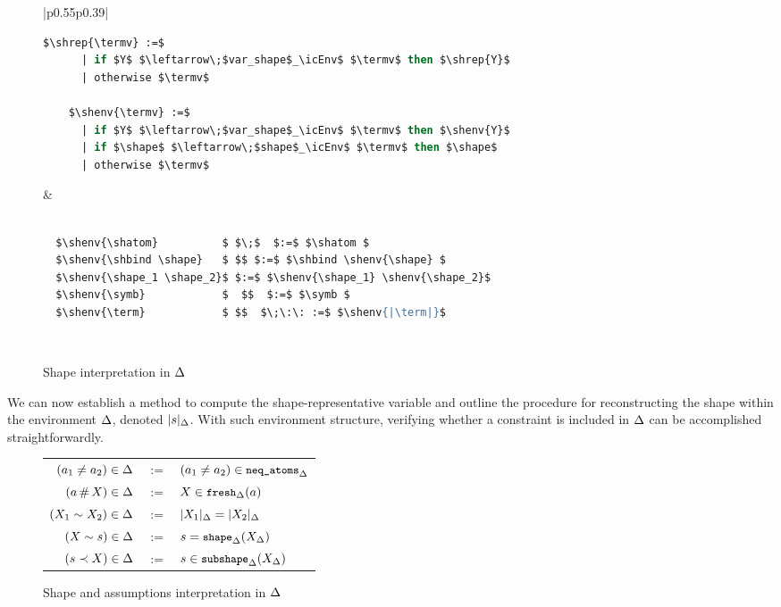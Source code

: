 \documentclass[english, mgr]{iithesis}
\renewcommand{\tt}[1]{\texttt{\small{#1}}}
\newcommand{\NeqAtoms}{\tt{neq\_atoms}}
\newcommand{\Fresh}{\tt{fresh}}
\newcommand{\Shape}{\tt{shape}}
\newcommand{\Subshape}{\tt{subshape}}
\newcommand{\shrep}[2][\icEnv]{\ensuremath{ #2_{#1}}}
\newcommand{\shenv}[2][\icEnv]{\ensuremath{ |#2|_{#1}}}
\begin{document}
\begin{figure}[htbp]
    \begin{tabular}{|p{}p{}|}
      \hline
      \begin{lstlisting}[mathescape,language=OCaml]
    $\shrep{\termv} :=$
      | if $Y$ $\leftarrow\;$var_shape$_\icEnv$ $\termv$ then $\shrep{Y}$
      | otherwise $\termv$

    $\shenv{\termv} :=$
      | if $Y$ $\leftarrow\;$var_shape$_\icEnv$ $\termv$ then $\shenv{Y}$
      | if $\shape$ $\leftarrow\;$shape$_\icEnv$ $\termv$ then $\shape$
      | otherwise $\termv$
      \end{lstlisting}
      &
      \begin{lstlisting}[mathescape,language=OCaml]

  $\shenv{\shatom}          $ $\;$  $:=$ $\shatom $
  $\shenv{\shbind \shape}   $ $$ $:=$ $\shbind \shenv{\shape} $
  $\shenv{\shape_1 \shape_2}$ $:=$ $\shenv{\shape_1} \shenv{\shape_2}$
  $\shenv{\symb}            $  $$  $:=$ $\symb $
  $\shenv{\term}            $ $$  $\;\:\: :=$ $\shenv{|\term|}$
      \end{lstlisting}
      \\ \hline
    \end{tabular}
  \caption{Shape interpretation in $\Delta$}
  \label{fig:interpretation}
\end{figure}
We can now establish a method to compute the shape-representative variable and
outline the procedure for reconstructing the shape within the environment $\Delta$,
denoted \shenv{\shape}.
With such environment structure, verifying whether a constraint is included in $\Delta$ can be accomplished straightforwardly.
\begin{figure}[htbp]
  \begin{mdframed}
    \centering
    \begin{tabular}{rcl}
      $(a_1 \neq a_2)  \in \Delta $ & $:=$ & $ (\atomv_1 \cneq \atomv_2) \in \NeqAtoms_{\icEnv} $ \\
      $(a \,\#\, X)    \in \Delta $ & $:=$ & $ \termv \in \Fresh_{\icEnv}(\atomv) $ \\
      $(X_1 \sim X_2) \in \Delta $ & $:=$ & $ \shenv{\termv_1} \ceq \shenv{\termv_2} $ \\
      $(X \sim s)     \in \Delta $ & $:=$ & $ \shape = \Shape_{\icEnv}(\shrep{\termv})$ \\
      $(s \prec X)     \in \Delta $ & $:=$ & $ \shape \in \Subshape_{\icEnv}(\shrep{\termv})$ \\
    \end{tabular}
\end{mdframed}
  \caption{Shape and assumptions interpretation in $\Delta$}
  \label{fig:interpretation}
\end{figure}
\end{document}
